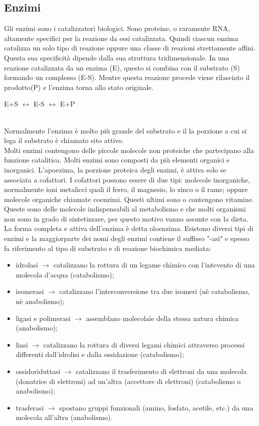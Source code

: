 \subsection{Enzimi}
Gli enzimi sono i catalizzatori biologici. Sono proteine, o raramente RNA, altamente specifici per la reazione da essi catalizzata. Quindi ciascun enzima catalizza un solo tipo di reazione oppure una classe di reazioni strettamente affini. Questa sua specificit\`a dipende dalla sua struttura tridimensionale. In una reazione catalizzata da un enzima (E), questo si combina con il substrato (S) formando un complesso (E-S). Mentre questa reazione procede viene rilasciato il prodotto(P) e l'enzima torna allo stato originale.
\\
\begin{center}E+S $\leftrightarrow$ E-S $\leftrightarrow$ E+P\end{center}
\\
Normalmente l'enzima \`e molto pi\`u grande del substrato e il la porzione a cui si lega il substrato \`e chiamato sito attivo.
\\Molti enzimi contengono delle piccole molecole non proteiche che partecipano alla funzione catalitica. Molti enzimi sono composti da pi\`u elementi organici e inorganici. L'apoezima, la porzione proteica degli enzimi, \`e attiva solo se associata a cofattori. I cofattori possono essere di due tipi: molecole inorganiche, normalmente ioni metalicci quali il ferro, il magnesio, lo zinco o il rame; oppure molecole organiche chiamate coenzimi. Questi ultimi sono o contengono vitamine. Queste sono delle molecole indispensabili al metabolismo e che molti organismi non sono in grado di sintetizzare, per questo motivo vanno assunte con la dieta. La forma completa e attiva dell'enzima \`e detta oloenzima.
Esistono diversi tipi di enzimi e la maggiorparte dei nomi degli enzimi contiene il suffisso "-asi" e spesso fa riferimento al tipo di substrato e di reazione biochimica mediata:
\begin{itemize}
    \item idrolasi $\xrightarrow{}$ catalizzano la rottura di un legame chimico con l'intevento di una molecola d'acqua (catabolismo);
    \item isomerasi $\xrightarrow{}$ catalizzano l'interconversione tra due isomeri (n\`e catabolismo, n\`e anabolismo);
    \item ligasi e polimerasi $\xrightarrow{}$ assemblano molecolaìe della stessa natura chimica (anabolismo);
    \item liasi $\xrightarrow{}$ catalizzano la rottura di diversi legami chimici attraverso processi differenti dall'idrolisi e dalla ossidazione (catabolismo);
    \item ossidoriduttasi $\xrightarrow{}$ catalizzano il trasferimento di elettroni da una molecola (donatrice di elettroni) ad un'altra (accettore di elettroni) (catabolismo o anabolismo);
    \item trasferasi $\xrightarrow{}$ spostano gruppi funzionali (amino, fosfato, acetile, etc.) da una molecola all'altra (anabolismo).
\end{itemize}
